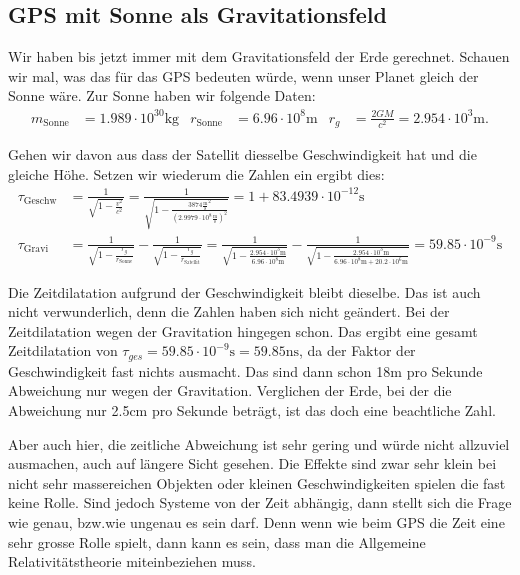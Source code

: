 \begin{refsection}
\subsection{GPS mit Sonne als Gravitationsfeld}
Wir haben bis jetzt immer mit dem Gravitationsfeld der Erde gerechnet. Schauen wir mal, was das für das GPS bedeuten würde, wenn unser Planet gleich der Sonne wäre. Zur Sonne haben wir folgende Daten:
\begin{align*}
m_{\text{Sonne}} &= 1.989 \cdot 10^30\text{kg} & r_{\text{Sonne}} &= 6.96 \cdot 10^8\text{m} & r_g &= \frac{2GM}{c^2} = 2.954 \cdot 10^3\text{m}. 
\end{align*}

\noindent{}Gehen wir davon aus dass der Satellit diesselbe Geschwindigkeit hat und die gleiche Höhe. Setzen wir wiederum die Zahlen ein ergibt dies:
\begin{align*}
\tau_{\text{Geschw}} &= \frac{1}{\sqrt{1 - \frac{v^2}{c^2}}} = \frac{1}{\sqrt{1 - \frac{3874 \frac{\text{m}}{\text{s}}^2}{(2.9979 \cdot 10^8 \frac{\text{m}}{\text{s}} )^2}}} = 1 + 83.4939 \cdot 10^{-12}\text{s}
\\
\tau_{\text{Gravi}} &= \frac{1}{\sqrt{1-\frac{r_g}{r_{\text{Sonne}}}}} - \frac{1}{\sqrt{1-\frac{r_g}{r_{\text{Satellit}}}}} =  
\frac{1}{\sqrt{1-\frac{2.954 \cdot 10^3\text{m}}{6.96 \cdot 10^8\text{m}}}} - \frac{1}{\sqrt{1-\frac{2.954 \cdot 10^3\text{m}}{ 6.96 \cdot 10^8\text{m} + 20.2 \cdot 10^6\text{m}}}} = 59.85 \cdot 10^{-9}\text{s}
\end{align*}

\noindent{}Die Zeitdilatation aufgrund der Geschwindigkeit bleibt dieselbe. Das ist auch nicht verwunderlich, denn die Zahlen haben sich nicht geändert. Bei der Zeitdilatation wegen der Gravitation hingegen schon. Das ergibt eine gesamt Zeitdilatation von \( \tau_{ges} = 59.85 \cdot 10^{-9}\text{s} = 59.85\text{ns} \), da der Faktor der Geschwindigkeit fast nichts ausmacht. Das sind dann schon 18m pro Sekunde Abweichung nur wegen der Gravitation. Verglichen der Erde, bei der die Abweichung nur 2.5cm pro Sekunde beträgt, ist das doch eine beachtliche Zahl.

Aber auch hier, die zeitliche Abweichung ist sehr gering und würde nicht allzuviel ausmachen, auch auf längere Sicht gesehen. Die Effekte sind zwar sehr klein bei nicht sehr massereichen Objekten oder kleinen Geschwindigkeiten spielen die fast keine Rolle. Sind jedoch Systeme von der Zeit abhängig, dann stellt sich die Frage wie genau, bzw.wie ungenau es sein darf. Denn wenn wie beim GPS die Zeit eine sehr grosse Rolle spielt, dann kann es sein, dass man die Allgemeine Relativitätstheorie miteinbeziehen muss.


\end{refsection}
